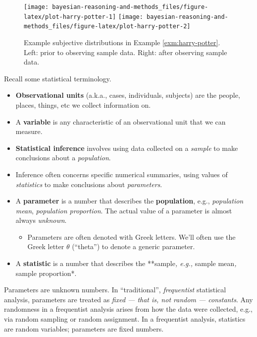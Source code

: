 \documentclass[
]{book}
\providecommand{\tightlist}{%
  \setlength{\itemsep}{0pt}\setlength{\parskip}{0pt}}
\theoremstyle{definition}
\theoremstyle{definition}
\theoremstyle{definition}
\theoremstyle{remark}
\begin{document}
\begin{figure}
\texttt{[image: bayesian-reasoning-and-methods\_files/figure-latex/plot-harry-potter-1]} \texttt{[image: bayesian-reasoning-and-methods\_files/figure-latex/plot-harry-potter-2]} \caption{Example subjective distributions in Example \ref{exm:harry-potter}. Left: prior to observing sample data. Right: after observing sample data.}\label{fig:plot-harry-potter}
\end{figure}

Recall some statistical terminology.

\begin{itemize}
\tightlist
\item
  \textbf{Observational units} (a.k.a., cases, individuals, subjects) are the people, places, things, etc we collect information on.
\item
  A \textbf{variable} is any characteristic of an observational unit that we can measure.
\item
  \textbf{Statistical inference} involves using data collected on a \emph{sample} to make conclusions about a \emph{population}.\\
\item
  Inference often concerns specific numerical summaries, using values of \emph{statistics} to make conclusions about \emph{parameters}.
\item
  A \textbf{parameter} is a number that describes the \textbf{population}, e.g., \emph{population mean}, \emph{population proportion}. The actual value of a parameter is almost always \emph{unknown}.

  \begin{itemize}
  \tightlist
  \item
    Parameters are often denoted with Greek letters. We'll often use the Greek letter \(\theta\) (``theta'') to denote a generic parameter.
  \end{itemize}
\item
  A \textbf{statistic} is a number that describes the **sample\emph{, e.g., }sample mean\emph{, }sample proportion*.
\end{itemize}

Parameters are unknown numbers. In ``traditional'', \emph{frequentist} statistical analysis, parameters are treated as \emph{fixed --- that is, not random --- constants}. Any randomness in a frequentist analysis arises from how the data were collected, e.g., via random sampling or random assignment. In a frequentist analysis, statistics are random variables; parameters are fixed numbers.
\end{document}
